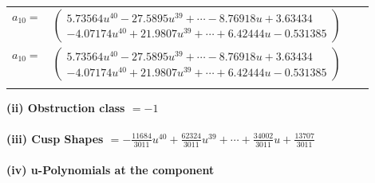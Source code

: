 \documentclass[1p]{elsarticle_modified}
\theoremstyle{definition}
\begin{document}
\begin{tabular}{m{7pt} m{180pt} m{7pt} m{180pt} }
\flushright $a_{10}=$&$\begin{pmatrix}5.73564 u^{40}-27.5895 u^{39}+\cdots-8.76918 u+3.63434\\-4.07174 u^{40}+21.9807 u^{39}+\cdots+6.42444 u-0.531385\end{pmatrix}$\\ \flushright $a_{10}=$&$\begin{pmatrix}5.73564 u^{40}-27.5895 u^{39}+\cdots-8.76918 u+3.63434\\-4.07174 u^{40}+21.9807 u^{39}+\cdots+6.42444 u-0.531385\end{pmatrix}$\\&\end{tabular}
\flushleft \textbf{(ii) Obstruction class $= -1$}\\~\\
\flushleft \textbf{(iii) Cusp Shapes $= -\frac{11684}{3011} u^{40}+\frac{62324}{3011} u^{39}+\cdots+\frac{34002}{3011} u+\frac{13707}{3011}$}\\~\\
\newpage\renewcommand{\arraystretch}{1}
\flushleft \textbf{(iv) u-Polynomials at the component}\newline \\
\end{document}
